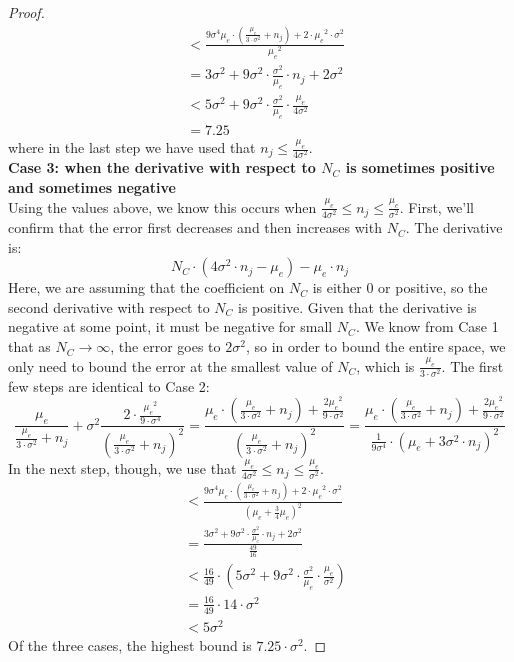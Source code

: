 \documentclass{article}
\newcommand{\p}[1]{\left( #1 \right)}
\newcommand{\cd}[0]{\cdot}
\newcommand{\mue}[0]{\ensuremath{\mu_e}}
\newcommand{\var}[0]{\ensuremath{\sigma^2}}
\newcommand{\ndraw}[0]{\ensuremath{n}}
\newcommand{\total}[0]{\ensuremath{N}}
\newcommand{\col}[0]{\ensuremath{C}}
\begin{document}
\begin{proof}
\begin{align*}
&<\frac{ 9 \sigma^4 \mue \cd \p{\frac{\mue}{3 \cd \var} + \ndraw_j} + 2 \cd \mue^2 \cd \var}{\mue^2}\\
&= 3\var + 9 \var \cd \frac{\var}{\mue} \cd \ndraw_j + 2 \var \\
&< 5 \var + 9 \var \cd \frac{\var}{\mue} \cd \frac{\mue}{4\var} \\
& = 7.25
\end{align*}
where in the last step we have used that $\ndraw_j \leq \frac{\mue}{4\var}$. \\
\textbf{Case 3: when the derivative with respect to $\total_{\col}$ is sometimes positive and sometimes negative}\\
Using the values above, we know this occurs when $\frac{\mue}{4\var} \leq \ndraw_j \leq \frac{\mue}{\var}$.  First, we'll confirm that the error first decreases and then increases with $\total_{\col}$. The derivative is: 
$$\total_{\col} \cd (4 \var \cd \ndraw_j - \mue) - \mue \cd\ndraw_j$$
Here, we are assuming that the coefficient on $\total_{\col}$ is either 0 or positive, so the second derivative with respect to $\total_{\col}$ is positive. Given that the derivative is negative at some point, it must be negative for small $\total_{\col}$.  We know from Case 1 that as $\total_{\col} \rightarrow \infty$, the error goes to $2\var$, so in order to bound the entire space, we only need to bound the error at the smallest value of $\total_{\col}$, which is $\frac{\mue}{3\cd \var}$. The first few steps are identical to Case 2: 
$$\frac{\mue}{\frac{\mue}{3 \cd \var} + \ndraw_j} + \var \frac{2 \cd  \frac{\mue^2}{9\cd \sigma^4}}{\p{\frac{\mue}{3 \cd \var} + \ndraw_j}^2}=\frac{ \mue \cd \p{\frac{\mue}{3 \cd \var} + \ndraw_j} + \frac{2 \mue^2}{9\cd \var}}{\p{\frac{\mue}{3 \cd \var} + \ndraw_j}^2} =\frac{ \mue \cd \p{\frac{\mue}{3 \cd \var} + \ndraw_j} + \frac{2 \mue^2}{9\cd \var}}{\frac{1}{9 \sigma^4}\cd \p{\mue + 3 \var \cd \ndraw_j}^2}$$
In the next step, though, we use that $\frac{\mue}{4\var} \leq \ndraw_j \leq \frac{\mue}{\var}$. 
\begin{align*}
&<\frac{ 9 \sigma^4 \mue \cd \p{\frac{\mue}{3 \cd \var} + \ndraw_j} + 2 \cd \mue^2 \cd \var}{(\mue + \frac{3}{4} \mue)^2}\\
&= \frac{3\var + 9 \var \cd \frac{\var}{\mue} \cd \ndraw_j + 2 \var}{\frac{49}{16}}  \\
&< \frac{16}{49} \cd \p{5 \var + 9 \var \cd \frac{\var}{\mue} \cd \frac{\mue}{\var}}\\
&= \frac{16}{49} \cd 14 \cd \var \\
& < 5 \var
\end{align*}
Of the three cases, the highest bound is $7.25 \cd\var$. 
\end{proof}
\end{document}
